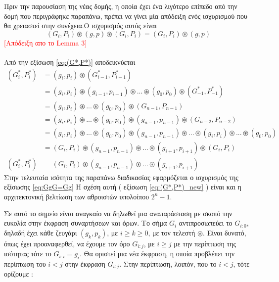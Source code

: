 Πριν την παρουσίαση της νέας δομής, η οποία έχει ένα λιγότερο επίπεδο από την δομή 
που περιγράφηκε παραπάνω, πρέπει να γίνει μία απόδειξη ενός ισχυρισμού που θα χρειαστεί στην 
συνέχεια.Ο ισχυρισμός αυτός είναι
\begin{equation}
\label{eq:GgG=Gg}
    (G_i,P_i)\circledast(g,p)\circledast(G_i,P_i) = (G_i,P_i)\circledast(g,p)
\end{equation}
\textcolor{red}{[Απόδειξη απο το \cite{vergos} Lemma 3]}
\\\\
Από την εξίσωση \ref{eq:(G*,P*)} αποδεικνύεται 
\begin{equation}
\label{eq:(G*,P*)_new}
    \begin{split}
        (G^*_i,P^*_i) &= (g_i,p_i) \circledast (G^*_{i-1},P^*_{i-1})\\
        &= (g_i,p_i) \circledast (g_{i-1},p_{i-1}) \circledast ... \circledast (g_0,p_0) \circledast (G^*_{-1},P^*_{-1})\\
        &= (g_i,p_i) \circledast ... \circledast (g_0,p_0) \circledast (G_{n-1},P_{n-1})\\
        &= (g_i,p_i) \circledast ... \circledast (g_0,p_0) \circledast (g_{n-1},p_{n-1}) \circledast (G_{n-2},P_{n-2})\\
        &= (g_i,p_i) \circledast ... \circledast (g_0,p_0) \circledast (g_{n-1},p_{n-1})
        \circledast ... \circledast (g_i,p_i) \circledast ... \circledast (g_0,p_0)\\
        &= (G_i,P_i) \circledast (g_{n-1},p_{n-1}) \circledast ... \circledast (g_{i+1},p_{i+1})
        \circledast (G_i,P_i)\\
        (G^*_i,P^*_i) &= (G_i,P_i) \circledast (g_{n-1},p_{n-1}) \circledast ... \circledast (g_{i+1},p_{i+1})
    \end{split}
\end{equation}
Στην τελευταία ισότητα της παραπάνω διαδικασίας εφαρμόζεται ο ισχυρισμός της εξίσωσης \ref{eq:GgG=Gg}
Η σχέση αυτή ( εξίσωση \ref{eq:(G*,P*)_new} ) είναι και η αρχιτεκτονική βελτίωση των αθροιστών υπολοίπου
$2^n-1$.

Σε αυτό το σημείο είναι αναγκαίο να δηλωθεί μια αναπαράσταση με σκοπό την ευκολία στην
έκφραση συναρτήσεων και όρων. Το σήμα $G_{i}$ αντιπροσωπεύει το $G_{i:0}$, δηλαδή
έχει κάθε ζευγάρι $(g_k,p_k)$, με $ i \geq k \geq 0 $, με τον τελεστή $\circledast$.
Είναι δυνατό, όπως έχει προαναφερθεί, να έχουμε τον όρο $G_{i:j}$, με $ i \geq j$ με
την περίπτωση της ισότητας τότε το $G_{i:i} = g_i$. Θα οριστεί μια νέα έκφραση, η οποία 
προβλέπει την περίπτωση του $i < j$ στην έκφραση $G_{i:j}$. Στην περίπτωση, λοιπόν, που το
$i < j$, τότε ορίζουμε :

